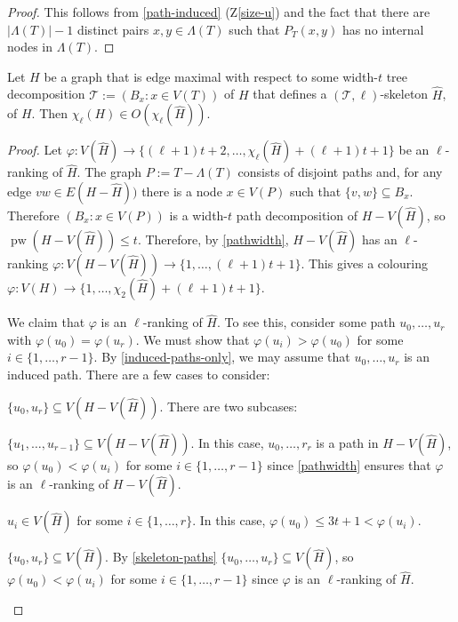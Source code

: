\documentclass[kpfonts]{patmorin}
\DeclareMathOperator{\pw}{pw}
\newcommand{\trn}{\chi_2}
\newcommand{\lrn}{\chi_{\ell}}
\theoremstyle{named}
\begin{document}
\begin{proof}
    This follows from \cref{path-induced} (Z\ref{size-u}) and the fact that there are $|\Lambda(T)|-1$ distinct pairs $x,y\in\Lambda(T)$ such that $P_T(x,y)$ has no internal nodes in $\Lambda(T)$.
\end{proof}


\begin{lem}\label{skeleton-colour}
    Let $H$ be a graph that is edge maximal with respect to some width-$t$ tree decomposition $\mathcal{T}:=(B_x:x\in V(T))$ of $H$ that defines a $(\mathcal{T},\ell)$-skeleton $\hat{H}$, of $H$.  Then $\lrn(H)\in O(\lrn(\hat{H}))$.
\end{lem}

\begin{proof}
    Let $\varphi:V(\hat{H})\to \{(\ell+1)t+2,\ldots,\lrn(\hat{H})+(\ell+1)t+1\}$ be an $\ell$-ranking of $\hat{H}$. The graph $P:=T-\Lambda(T)$ consists of disjoint paths and, for any edge $vw\in E(H-\hat{H}))$ there is a node $x\in V(P)$ such that $\{v,w\}\subseteq B_x$.  Therefore $(B_x:x\in V(P))$ is a width-$t$ path decomposition of $H-V(\hat{H})$, so $\pw(H-V(\hat{H}))\le t$.  Therefore, by \cref{pathwidth}, $H-V(\hat{H})$ has an $\ell$-ranking $\varphi:V(H-V(\hat{H}))\to\{1,\ldots,(\ell+1)t+1\}$.  This gives a colouring $\varphi: V(H)\to\{1,\ldots,\trn(\hat{H})+(\ell+1)t+1\}$.

    We claim that $\varphi$ is an $\ell$-ranking of $\hat{H}$.  To see this, consider some path $u_0,\ldots,u_r$ with $\varphi(u_0)=\varphi(u_r)$.  We must show that $\varphi(u_i)>\varphi(u_0)$ for some $i\in\{1,\ldots,r-1\}$.
    By \cref{induced-paths-only}, we may assume that $u_0,\ldots,u_r$ is an induced path. There are a few cases to consider:
    \begin{compactenum}
        \item $\{u_0,u_r\}\subseteq V(H-V(\hat{H}))$. There are two subcases:
        \begin{compactenum}
            \item $\{u_1,\ldots,u_{r-1}\}\subseteq V(H-V(\hat{H}))$.  In this case, $u_0,\ldots,r_r$ is a path in $H-V(\hat{H})$, so  $\varphi(u_0)<\varphi(u_i)$ for some $i\in\{1,\ldots,r-1\}$ since \cref{pathwidth} ensures that $\varphi$ is an $\ell$-ranking of $H-V(\hat{H})$.

            \item $u_i\in V(\hat{H})$ for some $i\in\{1,\ldots,r\}$. In this case, $\varphi(u_0)\le 3t+1 < \varphi(u_i)$.
        \end{compactenum}
        \item $\{u_0,u_r\}\subseteq V(\hat{H})$.
        By \cref{skeleton-paths}  $\{u_0,\ldots,u_r\}\subseteq V(\hat{H})$, so  $\varphi(u_0)<\varphi(u_i)$ for some $i\in\{1,\ldots,r-1\}$ since $\varphi$ is an $\ell$-ranking of $\hat{H}$. \qedhere
    \end{compactenum}
\end{proof}
\end{document}
